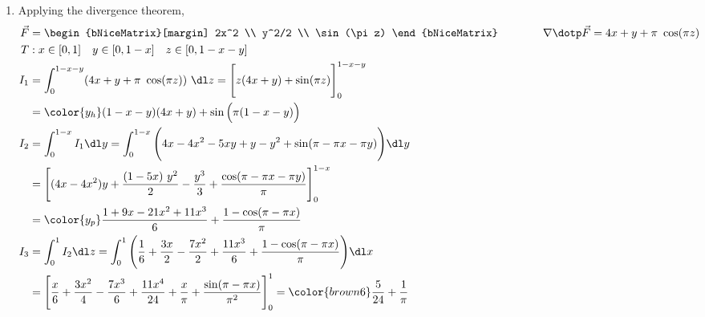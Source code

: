 \begin{enumerate}
     \item Applying the divergence theorem,
           \begin{align}
                \vec{F} & = \begin{bNiceMatrix}[margin]
                                 2x^2 \\ y^2/2 \\ \sin(\pi z)
                            \end{bNiceMatrix} \qquad\qquad
                \nabla \dotp \vec{F} = 4x + y + \pi\ \cos(\pi z)                     \\
                T       & : x \in [0, 1] \quad y \in [0, 1-x] \quad z \in [0, 1-x-y] \\
                I_1     & = \int_{0}^{1-x-y} (4x + y + \pi\ \cos(\pi z))\ \dl z
                = \Bigg[ z(4x + y) + \sin(\pi z) \Bigg]_{0}^{1-x-y}                  \\
                        & = {\color{y_h} (1 - x - y)(4x + y)
                + \sin \Big(\pi(1-x-y)\Big)}                                         \\
                I_2     & = \int_{0}^{1-x}I_1 \dl y = \int_{0}^{1-x}
                \Bigg( 4x - 4x^2 - 5xy + y - y^2 + \sin(\pi - \pi x - \pi y)
                \Bigg) \dl y                                                         \\
                        & = \Bigg[ (4x - 4x^2)y + \frac{(1 - 5x)\ y^2}{2}
                     -\frac{y^3}{3} + \frac{\cos(\pi - \pi x - \pi y)}{\pi}
                \Bigg]_{0}^{1-x}                                                     \\
                        & = {\color{y_p} \frac{1 + 9x - 21x^2 + 11x^3}{6}
                + \frac{1 - \cos(\pi - \pi x)}{\pi}}                                 \\
                I_3     & = \int_{0}^{1} I_2 \dl z = \int_{0}^{1}
                \Bigg( \frac{1}{6} + \frac{3x}{2} - \frac{7x^2}{2}
                + \frac{11x^3}{6} + \frac{1 - \cos(\pi - \pi x)}{\pi} \Bigg) \dl x   \\
                        & = \Bigg[ \frac{x}{6} + \frac{3x^2}{4} - \frac{7x^3}{6}
                     + \frac{11x^4}{24} + \frac{x}{\pi}
                     + \frac{\sin(\pi - \pi x)}{\pi^2} \Bigg]_0^1
                = {\color{brown6} \frac{5}{24} + \frac{1}{\pi}}
           \end{align}


\end{enumerate}
